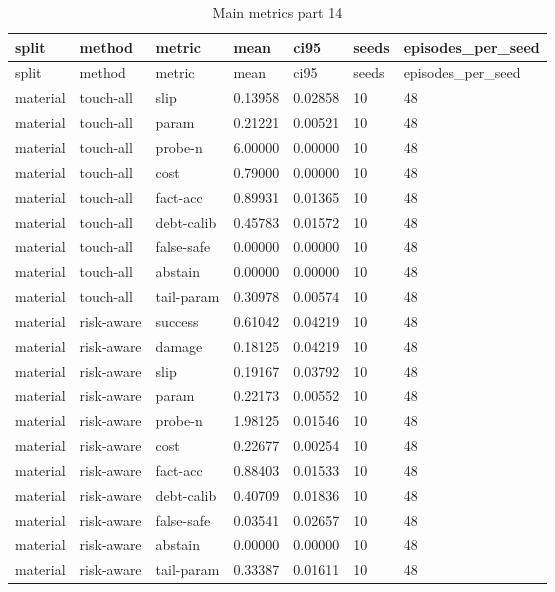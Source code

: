 \documentclass{article}
\begin{document}
\begin{center}
\tiny
\renewcommand{\arraystretch}{0.92}
\setlength{\tabcolsep}{3pt}
\begin{longtable}{lllllll}
\caption{Main metrics part 14}\label{tab:main-metrics-14}\\
\toprule
split & method & metric & mean & ci95 & seeds & episodes\_per\_seed \\
\midrule
\endfirsthead
\toprule
split & method & metric & mean & ci95 & seeds & episodes\_per\_seed \\
\midrule
\endhead
material & touch-all & slip & 0.13958 & 0.02858 & 10 & 48 \\
material & touch-all & param & 0.21221 & 0.00521 & 10 & 48 \\
material & touch-all & probe-n & 6.00000 & 0.00000 & 10 & 48 \\
material & touch-all & cost & 0.79000 & 0.00000 & 10 & 48 \\
material & touch-all & fact-acc & 0.89931 & 0.01365 & 10 & 48 \\
material & touch-all & debt-calib & 0.45783 & 0.01572 & 10 & 48 \\
material & touch-all & false-safe & 0.00000 & 0.00000 & 10 & 48 \\
material & touch-all & abstain & 0.00000 & 0.00000 & 10 & 48 \\
material & touch-all & tail-param & 0.30978 & 0.00574 & 10 & 48 \\
material & risk-aware & success & 0.61042 & 0.04219 & 10 & 48 \\
material & risk-aware & damage & 0.18125 & 0.04219 & 10 & 48 \\
material & risk-aware & slip & 0.19167 & 0.03792 & 10 & 48 \\
material & risk-aware & param & 0.22173 & 0.00552 & 10 & 48 \\
material & risk-aware & probe-n & 1.98125 & 0.01546 & 10 & 48 \\
material & risk-aware & cost & 0.22677 & 0.00254 & 10 & 48 \\
material & risk-aware & fact-acc & 0.88403 & 0.01533 & 10 & 48 \\
material & risk-aware & debt-calib & 0.40709 & 0.01836 & 10 & 48 \\
material & risk-aware & false-safe & 0.03541 & 0.02657 & 10 & 48 \\
material & risk-aware & abstain & 0.00000 & 0.00000 & 10 & 48 \\
material & risk-aware & tail-param & 0.33387 & 0.01611 & 10 & 48 \\

\end{longtable}
\end{center}
\end{document}
